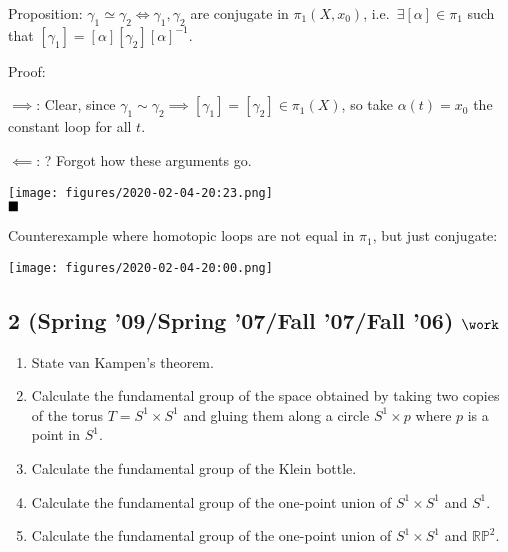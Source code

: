 
\begin{solution}

\hfill

\begin{concept}

\hfill

\end{concept}

Proposition: \(\gamma_1 \simeq\gamma_2 \iff \gamma_1, \gamma_2\) are
conjugate in \(\pi_1(X, x_0)\), i.e.~\(\exists [\alpha] \in \pi_1\) such
that \([\gamma_1] = [\alpha][\gamma_2][\alpha]^{-1}\).

Proof:

\(\implies\): Clear, since
\(\gamma_1 \sim \gamma_2 \implies [\gamma_1] = [\gamma_2] \in \pi_1(X)\),
so take \(\alpha(t) = x_0\) the constant loop for all \(t\).

\(\impliedby\): ? Forgot how these arguments go.

\texttt{[image: figures/2020-02-04-20:23.png]}\\

\(\hfill\blacksquare\)

Counterexample where homotopic loops are not equal in \(\pi_1\), but
just conjugate:

\texttt{[image: figures/2020-02-04-20:00.png]}\\

\end{solution}

\hypertarget{spring-09spring-07fall-07fall-06-work}{%
\subsection{\texorpdfstring{2 (Spring '09/Spring '07/Fall '07/Fall '06)
\(\work\)}{2 (Spring '09/Spring '07/Fall '07/Fall '06) \textbackslash work}}\label{spring-09spring-07fall-07fall-06-work}}

\begin{enumerate}
\def\labelenumi{\alph{enumi}.}
\item
  State van Kampen's theorem.
\item
  Calculate the fundamental group of the space obtained by taking two
  copies of the torus \(T = S^1 \times S^1\) and gluing them along a
  circle \(S^1 \times {p}\) where \(p\) is a point in \(S^1\).
\item
  Calculate the fundamental group of the Klein bottle.
\item
  Calculate the fundamental group of the one-point union of
  \(S^1 \times S^1\) and \(S^1\).
\item
  Calculate the fundamental group of the one-point union of
  \(S^1 \times S^1\) and \({\mathbb{RP}}^2\).
\end{enumerate}

